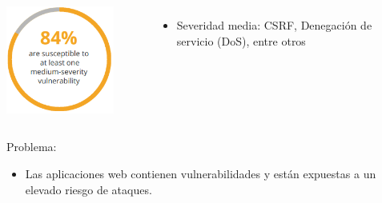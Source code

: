 \begin{frame}[t]
\begin{columns}
        \vspace{-0.4cm}
        \begin{center}
            \includegraphics[width=0.8\textwidth]{images/acunetix_vuln_report-2.png}
        \end{center}

        \vspace{-0.5cm}
        \begin{itemize}
            \item
            Severidad media:
            CSRF, Denegación de servicio (DoS), entre otros
        \end{itemize}
    \end{columns}
\end{frame}

\begin{frame}
    \begin{block}{Problema:}
        \begin{itemize}
            \item
            Las aplicaciones web contienen vulnerabilidades y están
            expuestas a un elevado riesgo de ataques.
        \end{itemize}
    \end{block}

\end{frame}

